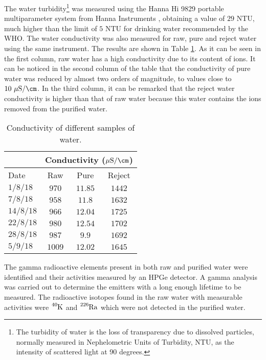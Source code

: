 The water turbidity\footnote{The turbidity of water is the loss of transparency due to dissolved particles, normally measured in Nephelometric Units of Turbidity, NTU, as the intensity of scattered light at 90 degrees.} was measured using the Hanna Hi 9829 portable multiparameter system from Hanna Instruments \cite{TurbiditySystem}, obtaining a value of $29$ NTU, much higher than the limit of $5$ NTU for drinking water recommended by the WHO. The water conductivity was also measured for raw, pure and reject water using the same instrument. The results are shown in Table \ref{tab:ConductivityValues}. As it can be seen in the first column, raw water has a high conductivity due to its content of ions. It can be noticed in the second column of the table that the conductivity of pure water was reduced by almost two orders of magnitude, to values close to $10~\mu\text{S}/\cm$. In the third column, it can be remarked that the reject water conductivity is higher than that of raw water because this water contains the ions removed from the purified water.


\begin{table}[htbp]
\centering{}%
\begin{tabular}{lccc}
\toprule 
& \multicolumn{3}{c}{Conductivity ($\mu\text{S}/\cm$)} \tabularnewline
\midrule
Date & Raw & Pure & Reject \tabularnewline
\midrule
\midrule 
$1/8/18$ & $970$ & $11.85$ & $1442$ \tabularnewline
$7/8/18$ & $958$ & $11.8$ & $1632$ \tabularnewline
$14/8/18$ & $966$ & $12.04$ & $1725$ \tabularnewline
$22/8/18$ & $980$ & $12.54$ & $1702$ \tabularnewline
$28/8/18$ & $987$ & $9.9$ & $1692$ \tabularnewline
$5/9/18$ & $1009$ & $12.02$ & $1645$ \tabularnewline
\bottomrule
\end{tabular}
\caption{Conductivity of different samples of water.}
\label{tab:ConductivityValues}
\end{table}

The gamma radioactive elements present in both raw and purified water were identified and their activities measured by an HPGe detector. A gamma analysis was carried out to determine the emitters with a long enough lifetime to be measured. The radioactive isotopes found in the raw water with measurable activities were $\ce{^{40}K}$ and $\ce{^{226}Ra}$ which were not detected in the purified water.


